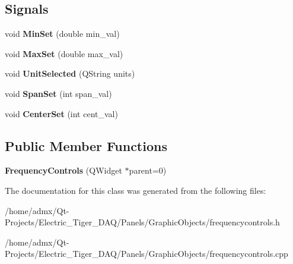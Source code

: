 \subsection*{Signals}
\begin{DoxyCompactItemize}
\item 
\hypertarget{class_frequency_controls_a3544c74823a7aaabc9a0779ae839eb7f}{void {\bfseries Min\+Set} (double min\+\_\+val)}\label{class_frequency_controls_a3544c74823a7aaabc9a0779ae839eb7f}

\item 
\hypertarget{class_frequency_controls_ad8606de91f4ec71aa8011f658da35a4e}{void {\bfseries Max\+Set} (double max\+\_\+val)}\label{class_frequency_controls_ad8606de91f4ec71aa8011f658da35a4e}

\item 
\hypertarget{class_frequency_controls_a5b873965eb03064dbcf713d0c66126d0}{void {\bfseries Unit\+Selected} (Q\+String units)}\label{class_frequency_controls_a5b873965eb03064dbcf713d0c66126d0}

\item 
\hypertarget{class_frequency_controls_aef534d12777d179c45b59a47c8c1b431}{void {\bfseries Span\+Set} (int span\+\_\+val)}\label{class_frequency_controls_aef534d12777d179c45b59a47c8c1b431}

\item 
\hypertarget{class_frequency_controls_afd8a0e6ada7b9063e15d55c9c6b562cb}{void {\bfseries Center\+Set} (int cent\+\_\+val)}\label{class_frequency_controls_afd8a0e6ada7b9063e15d55c9c6b562cb}

\end{DoxyCompactItemize}
\subsection*{Public Member Functions}
\begin{DoxyCompactItemize}
\item 
\hypertarget{class_frequency_controls_a41928b0575667ca2677e824a0907285b}{{\bfseries Frequency\+Controls} (Q\+Widget $\ast$parent=0)}\label{class_frequency_controls_a41928b0575667ca2677e824a0907285b}

\end{DoxyCompactItemize}


The documentation for this class was generated from the following files\+:\begin{DoxyCompactItemize}
\item 
/home/admx/\+Qt-\/\+Projects/\+Electric\+\_\+\+Tiger\+\_\+\+D\+A\+Q/\+Panels/\+Graphic\+Objects/frequencycontrols.\+h\item 
/home/admx/\+Qt-\/\+Projects/\+Electric\+\_\+\+Tiger\+\_\+\+D\+A\+Q/\+Panels/\+Graphic\+Objects/frequencycontrols.\+cpp\end{DoxyCompactItemize}
